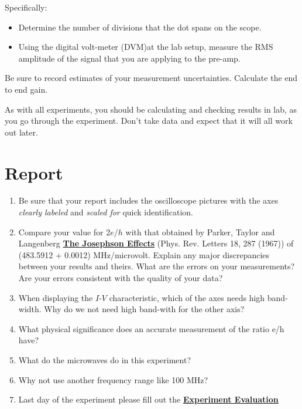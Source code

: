 \documentclass{../lab}
\begin{document}
\vspace{1em}

\noindent Specifically:

\begin{itemize}
    \item Determine the number of divisions that the dot spans on the scope.

    \item Using the digital volt-meter (DVM)at the lab setup, measure the RMS amplitude of the signal that you are applying to the pre-amp.
\end{itemize}

Be sure to record estimates of your measurement uncertainties. Calculate the end to end gain.


As with all experiments, you should be calculating and checking results in lab, as you go through the experiment. Don't take data and expect that it will all work out later.

\section{Report}

\begin{enumerate}
    \item Be sure that your report includes the oscilloscope pictures with the axes \emph{clearly labeled} and \emph{scaled for} quick identification.

    \item Compare your value for 2$e/h$ with that obtained by Parker, Taylor and Langenberg \href{http://physics111.lib.berkeley.edu/Physics111/Reprints/JOS/04-The\_Josephson\_Effects.pdf}{\textbf{The Josephson Effects}} (Phys. Rev. Letters 18, 287 (1967)) of (483.5912 + 0.0012) MHz/microvolt. Explain any major discrepancies between your results and theirs. What are the errors on your measurements? Are your errors consistent with the quality of your data?

    \item When displaying the $I$-$V$ characteristic, which of the axes needs high band-width. Why do we not need high band-with for the other axis?

    \item What physical significance does an accurate measurement of the ratio e/h have?

    \item What do the microwaves do in this experiment?

    \item Why not use another frequency range like 100 MHz?

    \item Last day of the experiment please fill out the \href{\ExperimentEvaluation}{\textbf{Experiment Evaluation}}

\end{enumerate}
\end{document}
